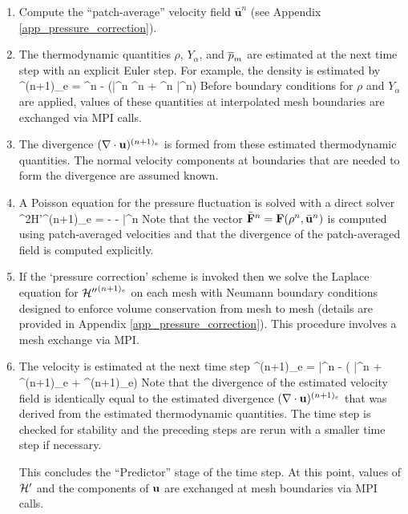 \documentclass[11pt]{book}
\begin{document}
\begin{enumerate}
\item Compute the ``patch-average'' velocity field $\bar{\mathbf{u}}^n$ (see Appendix \ref{app_pressure_correction}).

\item The thermodynamic quantities $\rho$, $Y_\alpha$, and $\overline{p}_m$ are
estimated at the next time step with an explicit Euler step. For
example, the density is estimated by
\be \rho^{(n+1)_e} = \rho^n - \dt (\bar{}^n \cdot \nabla \rho^n + \rho^n \nabla \cdot \bar{}^n) \ee
Before boundary conditions for $\rho$ and $Y_\alpha$ are applied, values of these quantities at
interpolated mesh boundaries are exchanged via MPI calls.

\item The divergence $(\nabla \cdot {\bf u})^{(n+1)_e}$ is formed from these
estimated thermodynamic quantities. The normal velocity components at
boundaries that are needed to form the divergence are assumed known.

\item A Poisson equation for the pressure fluctuation is solved with a direct solver
\be \nabla^2{\cal H'}^{(n+1)_e} = -  - \nabla \cdot \bar{\bF}^n  \ee
Note that the vector $\bar{{\bf F}}^n = {\bf F}(\rho^n,\bar{\mathbf{u}}^n)$ is computed using patch-averaged velocities and that the divergence of the patch-averaged field is computed explicitly.

\item If the `pressure correction' scheme is invoked then we solve the Laplace equation for ${{\cal H}''}^{(n+1)_e}$ on each mesh with Neumann boundary conditions designed to enforce volume conservation from mesh to mesh (details are provided in Appendix \ref{app_pressure_correction}).  This procedure involves a mesh exchange via MPI.

\item The velocity is estimated at the next time step
\be
\bu^{(n+1)_e} = \bar{}^n - \dt \left( \bar{\bF}^n + ^{(n+1)_e} + ^{(n+1)_e}\right)
\ee
Note that the divergence of the estimated velocity field is identically equal to the estimated divergence $(\nabla \cdot {\bf u})^{(n+1)_e}$ that was derived from the estimated thermodynamic quantities. The time step is checked for stability and the preceding steps are rerun with a smaller time step if necessary.

This concludes the ``Predictor'' stage of the time step.  At this point, values of $\cal H'$ and the components of ${\bf u}$ are exchanged at mesh boundaries via MPI calls.


\end{enumerate}
\end{document}
